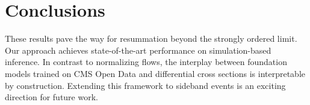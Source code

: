 \section{Conclusions}\label{sec:conclusions}

These results pave the way for resummation beyond the strongly ordered
limit. Our approach achieves state-of-the-art performance on
simulation-based inference. In contrast to normalizing flows, the
interplay between foundation models trained on CMS Open Data and
differential cross sections is interpretable by construction. Extending
this framework to sideband events is an exciting direction for future
work.

